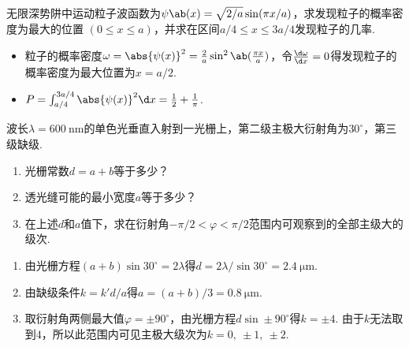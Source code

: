 \begin{problem}[无限深势阱][5]
    无限深势阱中运动粒子波函数为$\psi\ab(x)=\sqrt{2/a}\sin(\pi x/a)$，求发现粒子的概率密度为最大的位置 $(0\leq x\leq a)$，并求在区间$a/4\leq x\leq3a/4$发现粒子的几率.
\end{problem}
\begin{solution}
\begin{itemize}
    \item 粒子的概率密度$\omega=\abs{\psi(x)}^2=\frac2a\sin^2\ab(\frac{\pi x}{a})$，令$\frac{\d\omega}{\d x}=0$得发现粒子的概率密度为最大位置为$x=a/2$.
    \item $P=\int_{a/4}^{3a/4}\abs{\psi(x)}^2\d x=\frac12+\frac1\pi$.
\end{itemize}
\end{solution}

\begin{problem}[光栅][7]
    波长$\lambda=\qty{600}{\nm}$的单色光垂直入射到一光栅上，第二级主极大衍射角为$30^{\circ}$，第三级缺级.
    \begin{enumerate}
        \item 光栅常数$d=a+b$等于多少？
        \item 透光缝可能的最小宽度$a$等于多少？
        \item 在上述$d$和$a$值下，求在衍射角$-\pi/2<\varphi<\pi/2$范围内可观察到的全部主级大的级次.
    \end{enumerate}
\end{problem}
\begin{solution}
    \begin{enumerate}
        \item 由光栅方程$(a+b)\sin30^\circ=2\lambda$得$d=2\lambda/\sin 30^\circ=\qty{2.4}{\um}$.
        \item 由缺级条件$k=k'd/a$得$a=(a+b)/3=\qty{0.8}{\um}$.
        \item 取衍射角两侧最大值$\varphi=\pm 90^\circ$，由光栅方程$d\sin\pm90^\circ$得$k=\pm4$. 由于$k$无法取到$4$，所以此范围内可见主极大级次为$k=0,\ \pm 1,\ \pm2$.
    \end{enumerate}
\end{solution}

